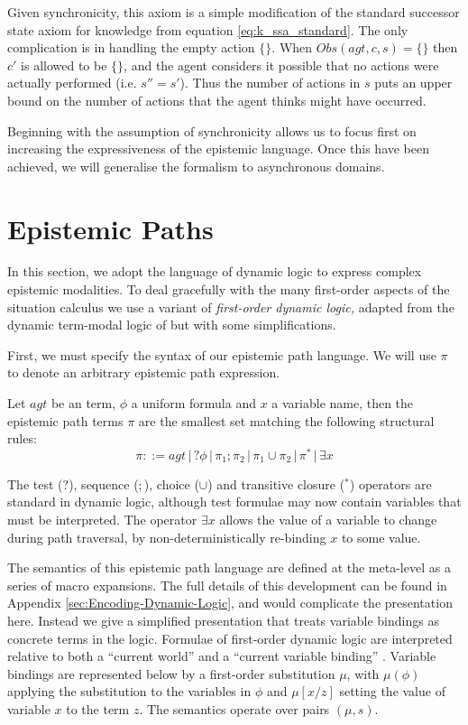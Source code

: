 Given synchronicity, this axiom is a simple modification of the standard
successor state axiom for knowledge from equation \eqref{eq:k_ssa_standard}.
The only complication is in handling the empty action $\{\}$. When
\textbf{$Obs(agt,c,s)=\{\}$} then $c'$ is allowed to be $\{\}$,
and the agent considers it possible that no actions were actually
performed (i.e. $s''=s'$). Thus the number of actions in $s$ puts
an upper bound on the number of actions that the agent thinks might
have occurred.

Beginning with the assumption of synchronicity allows us to focus
first on increasing the expressiveness of the epistemic language.
Once this have been achieved, we will generalise the formalism to
asynchronous domains.


\section{Epistemic Paths\label{sub:Epistemic-Paths}}

In this section, we adopt the language of dynamic logic to express
complex epistemic modalities. To deal gracefully with the many first-order
aspects of the situation calculus we use a variant of \emph{first-order
dynamic logic,} adapted from the dynamic term-modal logic of \citet{kooi07dyn_termmodal_logic}
but with some simplifications.

First, we must specify the syntax of our epistemic path language.
We will use $\pi$ to denote an arbitrary epistemic path expression.

\begin{defnL}
 Let $agt$ be an term, $\phi$
a uniform formula and $x$ a variable name, then the epistemic path
terms $\pi$ are the smallest set matching the following structural
rules:\[
\pi::=agt\,|\,?\phi\,|\,\pi_{1};\pi_{2}\,|\,\pi_{1}\cup\pi_{2}\,|\,\pi^{*}\,|\,\exists x\]

\end{defnL}
\smallskip{}


The test ($?$), sequence ($;$), choice ($\cup$) and transitive
closure ($^{*}$) operators are standard in dynamic logic, although
test formulae may now contain variables that must be interpreted.
The operator $\exists x$ allows the value of a variable to change
during path traversal, by non-deterministically re-binding $x$ to
some value.

The semantics of this epistemic path language are defined at the meta-level
as a series of macro expansions. The full details of this development
can be found in Appendix \ref{sec:Encoding-Dynamic-Logic}, and would
complicate the presentation here. Instead we give a simplified presentation
that treats variable bindings as concrete terms in the logic. Formulae
of first-order dynamic logic are interpreted relative to both a {}``current
world'' and a {}``current variable binding'' \citep{kooi07dyn_termmodal_logic}.
Variable bindings are represented below by a first-order substitution
$\mu$, with $\mu(\phi)$ applying the substitution to the variables
in $\phi$ and $\mu[x/z]$ setting the value of variable $x$ to the
term $z$. The semantics operate over pairs $(\mu,s)$.

